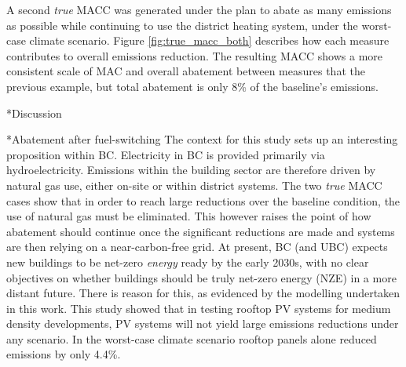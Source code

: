 \documentclass[twocolumn, a4paper,10pt]{article}
\makeatletter
\renewcommand\section{\@startsection{section}{1}{\z@}{3pt}{3pt}{\normalfont\large\bfseries}}
\renewcommand\subsection{\@startsection{subsection}{1}{\z@}{\z@}{\z@}{\normalfont\normalsize\bfseries}}
\renewcommand\subsection{\@startsection{subsection}{1}{\z@}{\z@}{0.1pt}{\normalfont\normalsize\bfseries}}
\makeatother
\begin{document}
A second \textit{true} MACC was generated under the plan to abate as many emissions as possible while continuing to use the district heating system, under the worst-case climate scenario. Figure \ref{fig:true_macc_both} describes how each measure contributes to overall emissions reduction. The resulting MACC shows a more consistent scale of MAC and overall abatement between measures that the previous example, but total abatement is only 8\% of the baseline's emissions.





\section*{Discussion}

\subsection*{Abatement after fuel-switching}
The context for this study sets up an interesting proposition within BC. Electricity in BC is provided primarily via hydroelectricity. Emissions within the building sector are therefore driven by natural gas use, either on-site or within district systems. The two \textit{true} MACC cases show that in order to reach large reductions over the baseline condition, the use of natural gas must be eliminated. This however raises the point of how abatement should continue once the significant reductions are made and systems are then relying on a near-carbon-free grid. At present, BC (and UBC) expects new buildings to be net-zero \textit{energy} ready by the early 2030s, with no clear objectives on whether buildings should be truly net-zero energy (NZE) in a more distant future. There is reason for this, as evidenced by the modelling undertaken in this work. This study showed that in testing rooftop PV systems for medium density developments, PV systems will not yield large emissions reductions under any scenario. In the worst-case climate scenario rooftop panels alone reduced emissions by only 4.4\%. 
\end{document}
